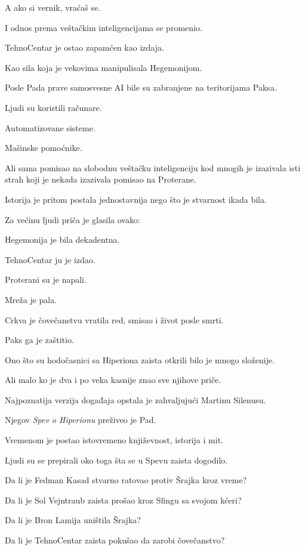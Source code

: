 A ako si vernik, vraćaš se.

\bigskip

I odnos prema veštačkim inteligencijama se promenio.

TehnoCentar je ostao zapamćen kao izdaja.

Kao sila koja je vekovima manipulisala Hegemonijom.

Posle Pada prave samosvesne AI bile su zabranjene na teritorijama Paksa.

Ljudi su koristili računare.

Automatizovane sisteme.

Mašinske pomoćnike.

Ali sama pomisao na slobodnu veštačku inteligenciju kod mnogih je izazivala isti strah koji je nekada izazivala pomisao na Proterane.

\bigskip

Istorija je pritom postala jednostavnija nego što je stvarnost ikada bila.

Za većinu ljudi priča je glasila ovako:

Hegemonija je bila dekadentna.

TehnoCentar ju je izdao.

Proterani su je napali.

Mreža je pala.

Crkva je čovečanstvu vratila red, smisao i život posle smrti.

Paks ga je zaštitio.

\bigskip

Ono što su hodočasnici sa Hiperiona zaista otkrili bilo je mnogo složenije.

Ali malo ko je dva i po veka kasnije znao sve njihove priče.

\bigskip

Najpoznatija verzija događaja opstala je zahvaljujući Martinu Silenusu.

Njegov \emph{Spev o Hiperionu} preživeo je Pad.

Vremenom je postao istovremeno književnost, istorija i mit.

Ljudi su se prepirali oko toga šta se u Spevu zaista dogodilo.

Da li je Fedman Kasad stvarno ratovao protiv Šrajka kroz vreme?

Da li je Sol Vejntraub zaista prošao kroz Sfingu sa svojom kćeri?

Da li je Bron Lamija uništila Šrajka?

Da li je TehnoCentar zaista pokušao da zarobi čovečanstvo?

